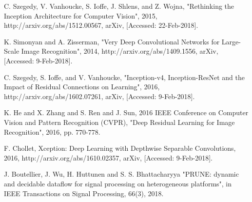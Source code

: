 \documentclass[conference]{IEEEtran}
\begin{document}
\begin{thebibliography}{00}
C. Szegedy, V. Vanhoucke, S. Ioffe, J. Shlens, and Z. Wojna, "Rethinking the Inception Architecture for Computer Vision", 2015, http://arxiv.org/abs/1512.00567, arXiv, [Accessed: 22-Feb-2018].

K. Simonyan and A. Zisserman, "Very Deep Convolutional Networks for Large-Scale Image Recognition", 2014, http://arxiv.org/abs/1409.1556, arXiv, [Accessed: 9-Feb-2018].

C. Szegedy, S. Ioffe, and V. Vanhoucke, "Inception-v4, Inception-ResNet and the Impact of Residual Connections on Learning", 2016, http://arxiv.org/abs/1602.07261, arXiv, [Accessed: 9-Feb-2018].

K. He and X. Zhang and S. Ren and J. Sun, 2016 IEEE Conference on Computer Vision and Pattern Recognition (CVPR), "Deep Residual Learning for Image Recognition", 2016, pp. 770-778.

F. Chollet, Xception: Deep Learning with Depthwise Separable Convolutions, 2016, http://arxiv.org/abs/1610.02357, arXiv, [Accessed: 9-Feb-2018]. 

 J. Boutellier, J. Wu, H. Huttunen and S. S. Bhattacharyya "PRUNE: dynamic and decidable dataflow for signal processing on heterogeneous platforms", in IEEE Transactions on Signal Processing, 66(3), 2018.


\iffalse

\bibitem{tensorflow}M. Abadi, A. Agarwal, P. Barham et.al, "TensorFlow: Large-Scale Machine Learning on Heterogeneous Distributed Systems", 2016, http://arxiv.org/abs/1603.04467, arXiv, Wed, 07 Jun 2017 14:40:20 +0200.

\bibitem{Koll2007}K. Kollreider and H. Fronthaler and M. I. Faraj and J. Bigun, IEEE Transactions on Information Forensics and Security, "Real-Time Face Detection and Motion Analysis With Application in "Liveness" Assessment", 2007, Vol. 2, No. 3, pp. 548-558

\bibitem{shi2012}K. Shi and S. Pang and F. Yu, 2012 2nd International Conference on Consumer Electronics, Communications and Networks, "A real-time face detection and recognition system", 2012, pp. 3074-3077

\bibitem{shak2002} G. Shakhnarovich and P. A. Viola and B. Moghaddam, Proceedings of Fifth IEEE International Conference on Automatic Face Gesture Recognition, "A unified learning framework for real time face detection and classification", 2002, pp. 14-21


\fi

\end{thebibliography}
\end{document}
